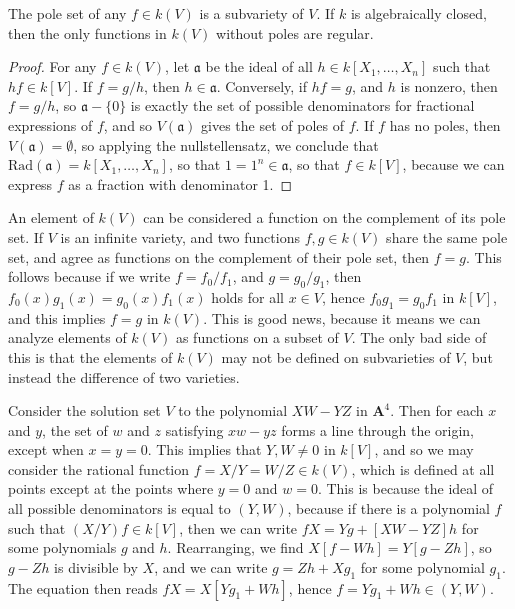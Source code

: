 \begin{prop}
    The pole set of any $f \in k(V)$ is a subvariety of $V$. If $k$ is algebraically closed, then the only functions in $k(V)$ without poles are regular.
\end{prop}
\begin{proof}
    For any $f \in k(V)$, let $\mathfrak{a}$ be the ideal of all $h \in k[X_1, \dots, X_n]$ such that $hf \in k[V]$. If $f = g/h$, then $h \in \mathfrak{a}$. Conversely, if $hf = g$, and $h$ is nonzero, then $f = g/h$, so $\mathfrak{a} - \{ 0 \}$ is exactly the set of possible denominators for fractional expressions of $f$, and so $V(\mathfrak{a})$ gives the set of poles of $f$. If $f$ has no poles, then $V(\mathfrak{a}) = \emptyset$, so applying the nullstellensatz, we conclude that $\text{Rad}(\mathfrak{a}) = k[X_1, \dots, X_n]$, so that $1 = 1^n \in \mathfrak{a}$, so that $f \in k[V]$, because we can express $f$ as a fraction with denominator 1.
\end{proof}

An element of $k(V)$ can be considered a function on the complement of its pole set. If $V$ is an infinite variety, and two functions $f,g \in k(V)$ share the same pole set, and agree as functions on the complement of their pole set, then $f = g$. This follows because if we write $f = f_0/f_1$, and $g = g_0/g_1$, then $f_0(x) g_1(x) = g_0(x) f_1(x)$ holds for all $x \in V$, hence $f_0g_1 = g_0f_1$ in $k[V]$, and this implies $f = g$ in $k(V)$. This is good news, because it means we can analyze elements of $k(V)$ as functions on a subset of $V$. The only bad side of this is that the elements of $k(V)$ may not be defined on subvarieties of $V$, but instead the difference of two varieties.

\begin{example}
    Consider the solution set $V$ to the polynomial $XW - YZ$ in $\mathbf{A}^4$. Then for each $x$ and $y$, the set of $w$ and $z$ satisfying $xw - yz$ forms a line through the origin, except when $x = y = 0$. This implies that $Y,W \neq 0$ in $k[V]$, and so we may consider the rational function $f = X/Y = W/Z \in k(V)$, which is defined at all points except at the points where $y = 0$ and $w = 0$. This is because the ideal of all possible denominators is equal to $(Y,W)$, because if there is a polynomial $f$ such that $(X/Y)f \in k[V]$, then we can write $fX = Yg + [XW - YZ]h$ for some polynomials $g$ and $h$. Rearranging, we find $X[f - Wh] = Y[g-Zh]$, so $g - Zh$ is divisible by $X$, and we can write $g = Zh + Xg_1$ for some polynomial $g_1$. The equation then reads $fX = X[Yg_1 + Wh]$, hence $f = Yg_1 + Wh \in (Y,W)$.
\end{example}

